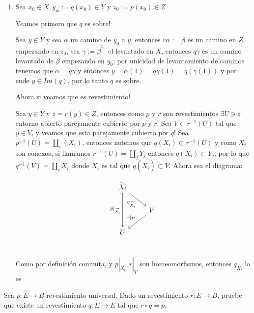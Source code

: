 \documentclass[11pt]{article}
\newenvironment{proof}[1][Demostraci\'on]{\begin{trivlist}
\item[\hskip \labelsep {\bfseries #1}]}{\end{trivlist}}
\newcommand{\qed}{\nobreak \ifvmode \relax \else
      \ifdim\lastskip<1.5em \hskip-\lastskip
      \hskip1.5em plus0em minus0.5em \fi \nobreak
      \vrule height0.75em width0.5em depth0.25em\fi}
\begin{document}
\begin{enumerate}
\begin{proof}

\begin{enumerate}

\item Sea $x_0 \in X, y_= := q(x_0) \in Y$ y $z_0 := p(x_0) \in Z$

Veamos primero que $q$ es sobre!

Sea $y \in Y$ y sea $\alpha$ un camino de $y_0$ a $y$, entonces $r\alpha:=\beta$ es un camino en $Z$ empezando en $z_0$, sea $\gamma := \widetilde{\beta}^{x_0}$ el levantado en $X$, entonces $q \gamma$ es un camino levantado de $\beta$ empezando en $y_0$; por unicidad de levantamiento de caminos tenemos que $\alpha = q \gamma$ y entonces $y = \alpha(1) = q \gamma(1) = q(\gamma(1))$ y por ende $y \in Im(q)$, por lo tanto $q$ es sobre.

Ahora si veamos que es revestimiento!

Sea $y \in Y$ y $z=r(y) \in Z$, entonces como $p$ y $r$ son revestimientos $\exists U \ni z$ entorno abierto parejamente cubierto por $p$ y $r$. Sea $V \subset r^{-1}(U)$ tal que $y \in V$, y veamos que esta parejamente cubierto por $q$! Sea $p^{-1}(U)= \coprod_{i}(X_i)$, entonces notemos que $q(X_i) \subset r^{-1}(U)$ y como $X_i$ son conexos, si llamamos $r^{-1}(U)= \coprod_{j} {Y_j}$ entonces $q(X_i) \subset Y_j$, por lo que $q^{-1}(V)= \coprod_{i}{\widetilde{X_i}}$ donde $\widetilde{X_i}$ es tal que $q(\widetilde{X_i}) \subset V$. Ahora sea el diagrama:

\[
\begin{tikzcd}
\widetilde{X_i} \arrow[swap]{dr}{q_{\widetilde{X_i}}} \arrow[swap]{dd}{p|_{\widetilde{X_i}}} & \\
 & V \arrow[swap]{dl}{r|_{V}} \\
U & \\
\end{tikzcd}
\]

Como por definici\'on conmuta, y $p|_{\widetilde{X_i}}, r|_{V}$ son homeomorfismos, entonces $q_{\widetilde{X_i}}$ lo es \qed

\end{enumerate}

\end{proof}

\item {Sea $p:\tilde E\rightarrow B$ revestimiento universal. Dado un revestimiento $r:E\rightarrow B$, pruebe que existe un revestimiento $q:\tilde E\rightarrow E$ tal que $r\circ q=p$.}


\end{enumerate}
\end{document}
